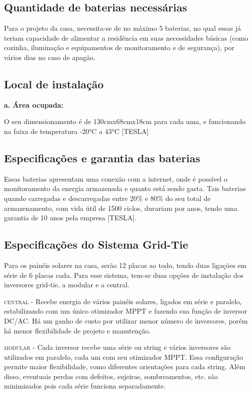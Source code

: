 \subsection{Quantidade de baterias necessárias}

	Para o projeto da casa, necessita-se de no máximo 5 baterias, no qual essas já teriam capacidade de alimentar a residência em suas necessidades básicas (como cozinha, iluminação e equipamentos de monitoramento e de segurança), por vários dias no caso de apagão.

\subsection{Local de instalação}

\textbf{a. Área ocupada:}
	
	O seu dimensionamento é de 130cmx68cmx18cm para cada uma, e funcionando na faixa de temperatura -20°C a 43°C [TESLA]

\subsection{Especificações e garantia das baterias}

	Essas baterias apresentam uma conexão com a internet, onde é possível o monitoramento da energia armazenada e quanto está sendo gasta. Tais baterias quando carregadas e descarregadas entre 20\% e 80\% do seu total de armazenamento, com vida útil de 1500 ciclos, durariam por anos, tendo uma garantia de 10 anos pela empresa [TESLA].

\subsection{Especificações do Sistema Grid-Tie}

	Para os painéis solares na casa, serão 12 placas ao todo, tendo duas ligações em série de 6 placas cada. Para esse sistema, tem-se duas opções de instalação dos inversores grid-tie, a modular e a central.

	\textsc{central} - Recebe energia de vários painéis solares, ligados em série e paralelo, estabilizando com um único otimizador MPPT e fazendo sua função de inversor DC/AC. Há um ganho de custo por utilizar menor número de inversores, porém há menor flexibilidade de projeto e manutenção.

	\textsc{modular} - Cada inversor recebe uma série ou string e vários inversores são utilizados em paralelo, cada um com seu otimizador MPPT. Essa configuração permite maior flexibilidade, como diferentes orientações para cada string. Além disso, eventuais perdas com defeitos, sujeiras, sombreamentos, etc. são minimizados pois cada série funciona separadamente.

